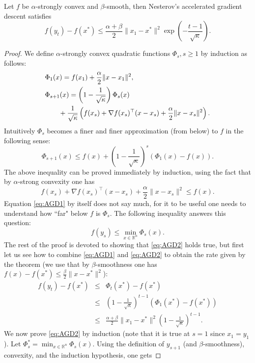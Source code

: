 \documentclass[openany]{now}
\begin{document}
\begin{theorem}
Let $f$ be $\alpha$-strongly convex and $\beta$-smooth, then Nesterov's accelerated gradient descent satisfies
$$f(y_t) - f(x^*) \leq \frac{\alpha + \beta}{2} \|x_1 - x^*\|^2 \exp\left(- \frac{t-1}{\sqrt{\kappa}} \right).$$
\end{theorem}

\begin{proof}
We define $\alpha$-strongly convex quadratic functions $\Phi_s, s \geq 1$ by induction as follows:
\begin{align}
& \Phi_1(x) = f(x_1) + \frac{\alpha}{2} \|x-x_1\|^2 , \notag \\
& \Phi_{s+1}(x) = \left(1 - \frac{1}{\sqrt{\kappa}}\right) \Phi_s(x) \notag \\
& \qquad + \frac{1}{\sqrt{\kappa}} \left(f(x_s) + \nabla f(x_s)^{\top} (x-x_s) + \frac{\alpha}{2} \|x-x_s\|^2 \right). \label{eq:AGD0}
\end{align}
Intuitively $\Phi_s$ becomes a finer and finer approximation (from below) to $f$ in the following sense:
\begin{equation} \label{eq:AGD1}
\Phi_{s+1}(x) \leq f(x) + \left(1 - \frac{1}{\sqrt{\kappa}}\right)^s (\Phi_1(x) - f(x)). 
\end{equation}
The above inequality can be proved immediately by induction, using the fact that by $\alpha$-strong convexity one has
$$f(x_s) + \nabla f(x_s)^{\top} (x-x_s) + \frac{\alpha}{2} \|x-x_s\|^2 \leq f(x) .$$
Equation \eqref{eq:AGD1} by itself does not say much, for it to be useful one needs to understand how ``far" below $f$ is $\Phi_s$. The following inequality answers this question:
\begin{equation} \label{eq:AGD2}
f(y_s) \leq \min_{x \in \mathbb{R}^n} \Phi_s(x) . 
\end{equation}
The rest of the proof is devoted to showing that \eqref{eq:AGD2} holds true, but first let us see how to combine \eqref{eq:AGD1} and \eqref{eq:AGD2} to obtain the rate given by the theorem (we use that by $\beta$-smoothness one has $f(x) - f(x^*) \leq \frac{\beta}{2} \|x-x^*\|^2$):
\begin{eqnarray*}
f(y_t) - f(x^*) & \leq & \Phi_t(x^*) - f(x^*) \\
& \leq & \left(1 - \frac{1}{\sqrt{\kappa}}\right)^{t-1} (\Phi_1(x^*) - f(x^*)) \\
& \leq & \frac{\alpha + \beta}{2} \|x_1-x^*\|^2 \left(1 - \frac{1}{\sqrt{\kappa}}\right)^{t-1} .
\end{eqnarray*}
We now prove \eqref{eq:AGD2} by induction (note that it is true at $s=1$ since $x_1=y_1$). Let $\Phi_s^* = \min_{x \in \mathbb{R}^n} \Phi_s(x)$. Using the definition of $y_{s+1}$ (and $\beta$-smoothness), convexity, and the induction hypothesis, one gets

\end{proof}
\end{document}
